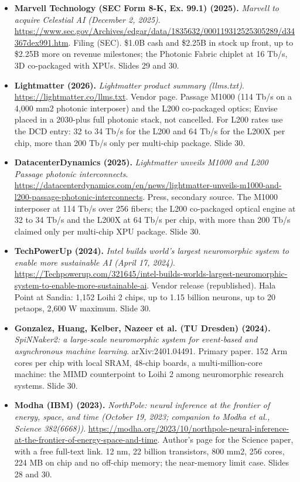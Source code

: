\documentclass[11pt,letterpaper]{article}
\begin{document}
\begin{itemize}[leftmargin=1.2em,itemsep=3pt]
\item \textbf{Marvell Technology (SEC Form 8-K, Ex. 99.1) (2025).} \textit{Marvell to acquire Celestial AI (December 2, 2025)}. \url{https://www.sec.gov/Archives/edgar/data/1835632/000119312525305289/d34367dex991.htm}. Filing (SEC). \$1.0B cash and \$2.25B in stock up front, up to \$2.25B more on revenue milestones; the Photonic Fabric chiplet at 16 Tb/s, 3D co-packaged with XPUs. Slides 29 and 30.
\item \textbf{Lightmatter (2026).} \textit{Lightmatter product summary (llms.txt)}. \url{https://lightmatter.co/llms.txt}. Vendor page. Passage M1000 (114 Tb/s on a 4,000 mm2 photonic interposer) and the L200 co-packaged optics; Envise placed in a 2030-plus full photonic stack, not cancelled. For L200 rates use the DCD entry: 32 to 34 Tb/s for the L200 and 64 Tb/s for the L200X per chip, more than 200 Tb/s only per multi-chip package. Slide 30.
\item \textbf{DatacenterDynamics (2025).} \textit{Lightmatter unveils M1000 and L200 Passage photonic interconnects}. \url{https://datacenterdynamics.com/en/news/lightmatter-unveils-m1000-and-l200-passage-photonic-interconnects}. Press, secondary source. The M1000 interposer at 114 Tb/s over 256 fibers; the L200 co-packaged optical engine at 32 to 34 Tb/s and the L200X at 64 Tb/s per chip, with more than 200 Tb/s claimed only per multi-chip XPU package. Slide 30.
\item \textbf{TechPowerUp (2024).} \textit{Intel builds world's largest neuromorphic system to enable more sustainable AI (April 17, 2024)}. \url{https://Techpowerup.com/321645/intel-builds-worlds-largest-neuromorphic-system-to-enable-more-sustainable-ai}. Vendor release (republished). Hala Point at Sandia: 1,152 Loihi 2 chips, up to 1.15 billion neurons, up to 20 petaops, 2,600 W maximum. Slide 30.
\item \textbf{Gonzalez, Huang, Kelber, Nazeer et al. (TU Dresden) (2024).} \textit{SpiNNaker2: a large-scale neuromorphic system for event-based and asynchronous machine learning}. arXiv:2401.04491. Primary paper. 152 Arm cores per chip with local SRAM, 48-chip boards, a multi-million-core machine: the MIMD counterpoint to Loihi 2 among neuromorphic research systems. Slide 30.
\item \textbf{Modha (IBM) (2023).} \textit{NorthPole: neural inference at the frontier of energy, space, and time (October 19, 2023; companion to Modha et al., Science 382(6668))}. \url{https://modha.org/2023/10/northpole-neural-inference-at-the-frontier-of-energy-space-and-time}. Author's page for the Science paper, with a free full-text link. 12 nm, 22 billion transistors, 800 mm2, 256 cores, 224 MB on chip and no off-chip memory; the near-memory limit case. Slides 28 and 30.

\end{itemize}
\end{document}
